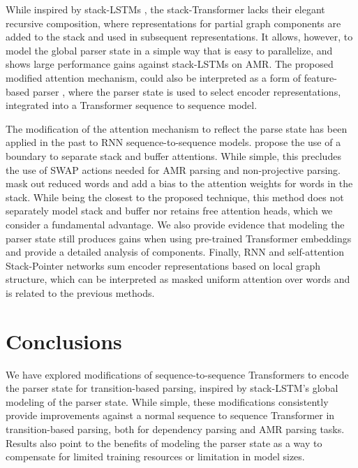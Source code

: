 \documentclass[11pt,a4paper]{article}
\begin{document}
While inspired by stack-LSTMs \cite{dyer2015transition}, the stack-Transformer lacks their elegant recursive composition, where representations for partial graph components are added to the stack and used in subsequent representations. It allows, however, to model the global parser state in a simple way that is easy to parallelize, and shows large performance gains against stack-LSTMs on AMR. The proposed modified attention mechanism, could also be interpreted as a form of feature-based parser \cite{kiperwasser-goldberg-2016-simple}, where the parser state is used to select encoder representations, integrated into a Transformer sequence to sequence model.

The modification of the attention mechanism to reflect the parse state has been applied in the past to RNN sequence-to-sequence models.  propose the use of a boundary to separate stack and buffer attentions. While simple, this precludes the use of SWAP actions needed for AMR parsing and non-projective parsing.  mask out reduced words and add a bias to the attention weights for words in the stack. While being the closest to the proposed technique, this method does not separately model stack and buffer nor retains free attention heads, which we consider a fundamental advantage. We also provide evidence that modeling the parser state still produces gains when using pre-trained Transformer embeddings and provide a detailed analysis of components. Finally, RNN \cite{ma-etal-2018-stack} and self-attention \cite{ahmad-etal-2019-difficulties} Stack-Pointer networks sum encoder representations based on local graph structure, which can be interpreted as masked uniform attention over  words and is related to the previous methods.

\section{Conclusions}

We have explored modifications of sequence-to-sequence Transformers to encode the parser state for transition-based parsing, inspired by stack-LSTM's global modeling of the parser state. While simple, these modifications consistently provide improvements against a normal sequence to sequence Transformer in transition-based parsing, both for dependency parsing and AMR parsing tasks. Results also point to the benefits of modeling the parser state as a way to compensate for limited training resources or limitation in model sizes. 
\end{document}
